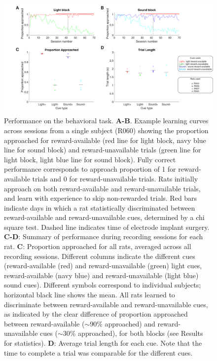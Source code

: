 \documentclass[11pt]{article}
\newcommand{\bsf}[1]{\textbf{#1}}
\begin{document}
{\begin{figure}[h]
\centering
\includegraphics[width=\textwidth]{Fig 4 - Behavioral results.png}
\caption{Performance on the behavioral task. \bsf{A-B}. Example learning curves
  across sessions from a single subject (R060) showing the proportion approached
  for reward-available (red line for light block, navy blue line for sound
  block) and reward-unavailable trials (green line for light block, light blue
  line for sound block). Fully correct performance corresponds to approach
  proportion of 1 for reward-available trials and 0 for reward-unavailable
  trials. Rats initially approach on both reward-available and
  reward-unavailable trials, and learn with experience to skip non-rewarded
  trials. Red bars indicate days in which a rat statistically discriminated
  between reward-available and reward-unavailable cues, determined by a chi
  square test. Dashed line indicates time of electrode implant
  surgery. \bsf{C-D}: Summary of performance during recording sessions for each
  rat. \bsf{C}: Proportion approached for all rats, averaged across all
  recording sessions. Different columns indicate the different cues
  (reward-available (red) and reward-unavailable (green) light cues,
  reward-available (navy blue) and reward-unavailable (light blue) sound
  cues). Different symbols correspond to individual subjects; horizontal black
  line shows the mean. All rats learned to discriminate between reward-available
  and reward-unavailable cues, as indicated by the clear difference of
  proportion approached between reward-available ($\sim$90\% approached) and
  reward-unavailable cues ($\sim$30\% approached), for both blocks (see Results
  for statistics). \bsf{D}: Average trial length for each cue. Note that the
  time to complete a trial was comparable for the different cues.}
\label{fig:behav}
\end{figure}

}
\end{document}
